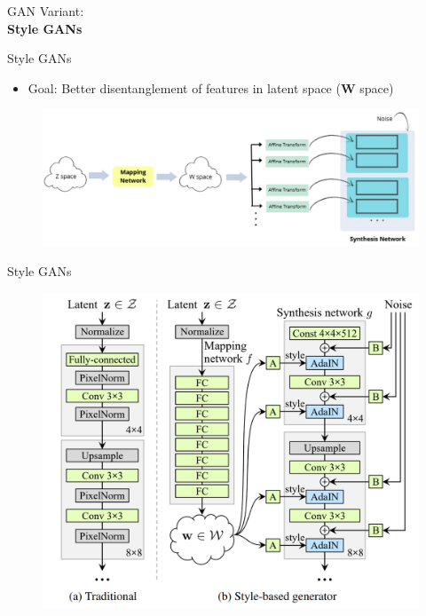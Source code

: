 \begin{frame}{}
    \LARGE GAN Variant: \\[1.5ex] \textbf{Style GANs}
\end{frame}

\begin{frame}[allowframebreaks]{Style GANs}
\begin{itemize}
    \item Goal: Better disentanglement of features in latent space (\textbf{W} space)
\end{itemize}
    \begin{figure}
    \centering
    \includegraphics[height=0.9\textheight, width=\textwidth, keepaspectratio]{images/gan/stylegan_2.png}
\end{figure}

\end{frame}
\begin{frame}[allowframebreaks]{Style GANs}
\begin{figure}
    \centering
    \includegraphics[height=0.9\textheight, width=\textwidth, keepaspectratio]{images/gan/stylegan_1.png}
\end{figure}
\end{frame}
